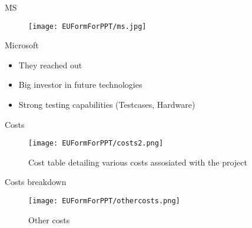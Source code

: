 \begin{frame}{MS}
    \begin{figure}
        \centering
        \texttt{[image: EUFormForPPT/ms.jpg]}
        \label{fig:ms-logo}
    \end{figure}
    Microsoft
    \begin{itemize}
        \item They reached out
        \item Big investor in future technologies
        \item Strong testing capabilities (Testcases, Hardware) 
    \end{itemize} 
\end{frame}

\begin{frame}{Costs}
    \begin{figure}
        \centering
        \texttt{[image: EUFormForPPT/costs2.png]}
        \caption{Cost table detailing various costs assosiated with the project}
        \label{fig:costs}
    \end{figure}
\end{frame}

\begin{frame}{Costs breakdown}
    \begin{figure}
        \centering
        \texttt{[image: EUFormForPPT/othercosts.png]}
        \caption{Other costs}
        \label{fig:other-costs}
    \end{figure}
\end{frame}